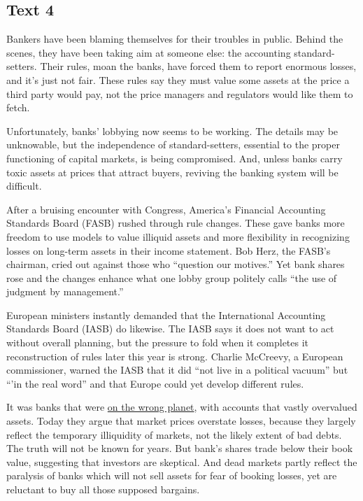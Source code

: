 \newpage
\subsection{Text 4}


Bankers have been blaming themselves for their troubles in public.
Behind the scenes, they have been taking aim at someone else: the
accounting standard-setters. Their rules, moan the banks, have forced
them to report enormous losses, and it's just not fair. These rules say
they must value some assets at the price a third party would pay, not
the price managers and regulators would like them to fetch.

Unfortunately, banks' lobbying now seems to be working. The details may
be unknowable, but the independence of standard-setters, essential to
the proper functioning of capital markets, is being compromised. And,
unless banks carry toxic assets at prices that attract buyers, reviving
the banking system will be difficult.

After a bruising encounter with Congress, America's Financial Accounting
Standards Board (FASB) rushed through rule changes. These gave banks
more freedom to use models to value illiquid assets and more flexibility
in recognizing losses on long-term assets in their income statement. Bob
Herz, the FASB's chairman, cried out against those who ``question our
motives.'' Yet bank shares rose and the changes enhance what one lobby
group politely calls ``the use of judgment by management.''

European ministers instantly demanded that the International Accounting
Standards Board (IASB) do likewise. The IASB says it does not want to
act without overall planning, but the pressure to fold when it completes
it reconstruction of rules later this year is strong. Charlie McCreevy,
a European commissioner, warned the IASB that it did ``not live in a
political vacuum'' but ``'in the real word'' and that Europe could yet
develop different rules.

It was banks that were \uline{on the wrong planet}, with accounts that vastly
overvalued assets. Today they argue that market prices overstate losses,
because they largely reflect the temporary illiquidity of markets, not
the likely extent of bad debts. The truth will not be known for years.
But bank's shares trade below their book value, suggesting that
investors are skeptical. And dead markets partly reflect the paralysis
of banks which will not sell assets for fear of booking losses, yet are
reluctant to buy all those supposed bargains.

